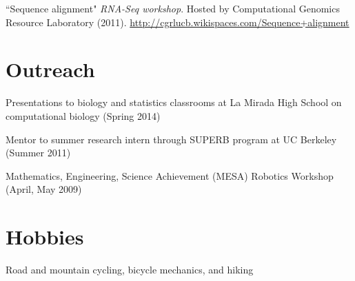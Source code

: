\documentclass[margin,line]{res}
\begin{document}
\begin{resume}
``Sequence alignment" {\emph{RNA-Seq workshop}}. Hosted by Computational Genomics Resource Laboratory (2011).  \url{http://cgrlucb.wikispaces.com/Sequence+alignment}

\section{\sc Outreach}
Presentations to biology and statistics classrooms at La Mirada High School on
computational biology (Spring 2014)

Mentor to summer research intern through SUPERB program at UC Berkeley (Summer
2011)

Mathematics, Engineering, Science Achievement (MESA) Robotics Workshop
(April, May 2009)
\vspace{-.25cm}

\section{\sc Hobbies}
Road and mountain cycling, bicycle mechanics, and hiking
\end{resume}
\end{document}

